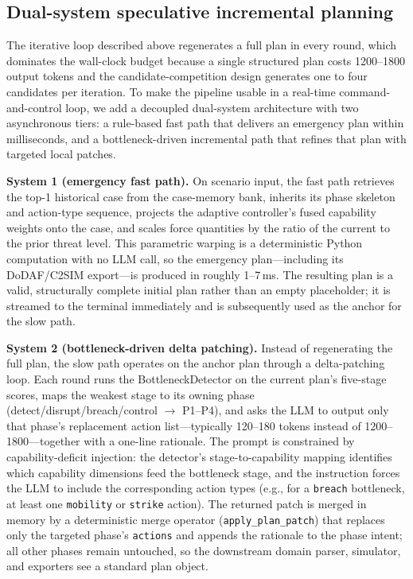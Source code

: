 \subsection{Dual-system speculative incremental planning}
\label{sec:dual-system}

The iterative loop described above regenerates a full plan in every round, which dominates the wall-clock budget because a single structured plan costs 1200--1800 output tokens and the candidate-competition design generates one to four candidates per iteration. To make the pipeline usable in a real-time command-and-control loop, we add a decoupled dual-system architecture with two asynchronous tiers: a rule-based fast path that delivers an emergency plan within milliseconds, and a bottleneck-driven incremental path that refines that plan with targeted local patches.

\textbf{System 1 (emergency fast path).} On scenario input, the fast path retrieves the top-1 historical case from the case-memory bank, inherits its phase skeleton and action-type sequence, projects the adaptive controller's fused capability weights onto the case, and scales force quantities by the ratio of the current to the prior threat level. This parametric warping is a deterministic Python computation with no LLM call, so the emergency plan---including its DoDAF/C2SIM export---is produced in roughly 1--7\,ms. The resulting plan is a valid, structurally complete initial plan rather than an empty placeholder; it is streamed to the terminal immediately and is subsequently used as the anchor for the slow path.

\textbf{System 2 (bottleneck-driven delta patching).} Instead of regenerating the full plan, the slow path operates on the anchor plan through a delta-patching loop. Each round runs the BottleneckDetector on the current plan's five-stage scores, maps the weakest stage to its owning phase (detect/disrupt/breach/control $\rightarrow$ P1--P4), and asks the LLM to output only that phase's replacement action list---typically 120--180 tokens instead of 1200--1800---together with a one-line rationale. The prompt is constrained by capability-deficit injection: the detector's stage-to-capability mapping identifies which capability dimensions feed the bottleneck stage, and the instruction forces the LLM to include the corresponding action types (e.g., for a \texttt{breach} bottleneck, at least one \texttt{mobility} or \texttt{strike} action). The returned patch is merged in memory by a deterministic merge operator (\texttt{apply\_plan\_patch}) that replaces only the targeted phase's \texttt{actions} and appends the rationale to the phase intent; all other phases remain untouched, so the downstream domain parser, simulator, and exporters see a standard plan object.


